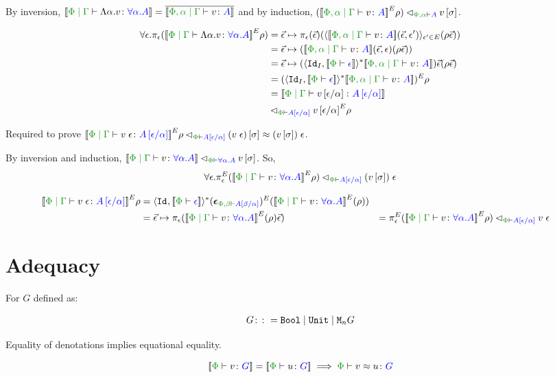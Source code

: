 \documentclass{Report}
\newcommand\eLogRel[4]{\logRel{#2}{\wellformed{#1}{#3}}{#4}}
\newcommand\peLogRel[3]{\eLogRel{\P}{#1}{#2}{#3}}
\newcommand{\zptyperelation}[2]{\typerelation{\P}{#1}{#2}}
\newcommand{\zpberelation}[2]{\berelation{\P}{#1}{#2}}
\newcommand{\fapply}[0]{^E}
\newcommand{\pe}[0]{\pi_\e}
\begin{document}
\case{\vgen}

By inversion, $\deno{\gpetyperelation{\elam{\a}{v}}{\all{\a}{A}}} = \bar{\deno{\etyperelation{\P,\a}{\G}{v}{A}}}$ and by induction, $\eLogRel{\P,\a}{(\deno{\etyperelation{\P,\a}{\G}{v}{A}}\fapply\rho)}{A}{v\ssi}$.

\begin{align*}
    \forall{\e}. \pe(\deno{\gpetyperelation{\elam{\a}{v}}{\all{\a}{A}}}\fapply\rho)&= \ev \mapsto \pe(\ev)(\finpr{\deno{\etyperelation{\P, \a}{\G}{v}{A}}(\ev, \e')}{\e'\in E}(\rho \ev))\\
    & = \ev \mapsto (\deno{\etyperelation{\P, \a}{\G}{v}{A}}(\ev, \e)(\rho \ev))\\
    & = \ev \mapsto (\pr{\Id{I}}{\deno{\wellformed{\P}{\e}}}\star\deno{\etyperelation{\P,\a}{\G}{v}{A}})\ev (\rho\ev)\\
    & = (\pr{\Id{I}}{\deno{\wellformed{\P}{\e}}}\star\deno{\etyperelation{\P,\a}{\G}{v}{A}})\fapply \rho\\
    & = \deno{\gpetyperelation{v\ssub{\a}{\e}}{A\ssub{\a}{\e}}}\\
    & \relates_{\wellformed{\P}{A\ssub{\a}{\e}}}{v\ssub{\a}{\e}}\fapply\rho
\end{align*}

\case{\vspec}
Required to prove $\peLogRel{\deno{\gpetyperelation{\eapp{v}{\e}}{A\ssub{\a}{\e}}}\fapply\rho}{A\ssub{\a}{\e}}{(\eapp{v}{\e})\ssi\beequiv\eapp{(v\ssi)}{\e}}$.

By inversion and induction, $\peLogRel{\deno{\gpetyperelation{v}{\all{\a}{A}}}}{\all{\a}{A}}{v\ssi}$. So, $$\forall\e. \peLogRel{\pe\fapply(\deno{\gpetyperelation{v}{\all{\a}{A}}}\fapply\rho)}{A\ssub{\a}{\e}}{\eapp{(v\ssi)}{\e}}$$

\begin{align*}
    \deno{\gpetyperelation{\eapp{v}{\e}}{A\ssub{\a}{\e}}}\fapply\rho & = \pr{\Id{}}{\deno{\wellformed{\P}{\e}}}\star(\counit{\wellformed{\P,\b}{A\ssub{\a}{\b}}})\fapply(\deno{\gpetyperelation{v}{\all{\a}{A}}}\fapply(\rho))\\
    & = \ev\mapsto\pe(\deno{\gpetyperelation{v}{\all{\a}{A}}}\fapply(\rho)\ev)
    & = \pe\fapply(\deno{\gpetyperelation{v}{\all{\a}{A}}}\fapply\rho)
    & \peLogRel{}{A\ssub{\a}{\e}}{\eapp{v}{\e}}
\end{align*}


\section{Adequacy}
\begin{theorem}[Adequacy]
For $G$ defined as:

\begin{align*}
    G\colon\colon= \texttt{Bool} \mid \texttt{Unit} \mid \texttt{M}_{n}{G}
\end{align*}

Equality of denotations implies equational equality.

\begin{equation}
    \deno{\zptyperelation{v}{G}} = \deno{\zptyperelation{u}{G}} \implies \zpberelation{v}{u}{G}
\end{equation}

\end{theorem}
\end{document}
